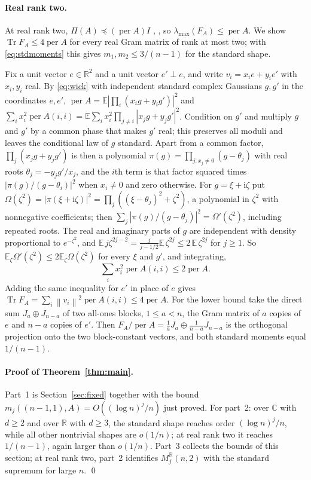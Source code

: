\documentclass[11pt,a4paper]{article}
\theoremstyle{remark}
\newcommand{\per}{\operatorname{per}}
\newcommand{\Tr}{\operatorname{Tr}}
\newcommand{\norm}[1]{\left\lVert#1\right\rVert}
\newcommand{\R}{\mathbb R}
\newcommand{\C}{\mathbb C}
\newcommand{\E}{\mathbb E}
\begin{document}
\paragraph{Real rank two.} At real rank two, $\Pi(A)\preceq(\per A)I$ \cite{Liq}, \cite[Appendix~A]{EPBS}, so $\lambda_{\max}(F_A)\le\per A$. We show $\Tr F_A\le4\per A$ for every real Gram matrix of rank at most two; with \eqref{eq:stdmoments} this gives $m_1,m_2\le3/(n-1)$ for the standard shape.

Fix a unit vector $e\in\R^2$ and a unit vector $e'\perp e$, and write $v_i=x_ie+y_ie'$ with $x_i,y_i$ real. By \eqref{eq:wick} with independent standard complex Gaussians $g,g'$ in the coordinates $e,e'$, $\per A=\E|\prod_i(x_ig+y_ig')|^2$ and $\sum_ix_i^2\per A(i,i)=\E\sum_ix_i^2\prod_{j\ne i}|x_jg+y_jg'|^2$. Condition on $g'$ and multiply $g$ and $g'$ by a common phase that makes $g'$ real; this preserves all moduli and leaves the conditional law of $g$ standard. Apart from a common factor, $\prod_j(x_jg+y_jg')$ is then a polynomial $\pi(g)=\prod_{j:x_j\ne0}(g-\theta_j)$ with real roots $\theta_j=-y_jg'/x_j$, and the $i$th term is that factor squared times $|\pi(g)/(g-\theta_i)|^2$ when $x_i\ne0$ and zero otherwise. For $g=\xi+\mathrm i\zeta$ put $\Omega(\zeta^2)=|\pi(\xi+\mathrm i\zeta)|^2=\prod_j((\xi-\theta_j)^2+\zeta^2)$, a polynomial in $\zeta^2$ with nonnegative coefficients; then $\sum_j|\pi(g)/(g-\theta_j)|^2=\Omega'(\zeta^2)$, including repeated roots. The real and imaginary parts of $g$ are independent with density proportional to $e^{-\zeta^2}$, and $\E\,j\zeta^{2j-2}=\frac{j}{j-1/2}\E\,\zeta^{2j}\le2\,\E\,\zeta^{2j}$ for $j\ge1$. So $\E_\zeta\Omega'(\zeta^2)\le2\E_\zeta\Omega(\zeta^2)$ for every $\xi$ and $g'$, and integrating,
\[
 \sum_ix_i^2\per A(i,i)\le2\per A .
\]
Adding the same inequality for $e'$ in place of $e$ gives $\Tr F_A=\sum_i\norm{v_i}^2\per A(i,i)\le4\per A$. For the lower bound take the direct sum $J_a\oplus J_{n-a}$ of two all-ones blocks, $1\le a<n$, the Gram matrix of $a$ copies of $e$ and $n-a$ copies of $e'$. Then $F_A/\per A=\frac1aJ_a\oplus\frac1{n-a}J_{n-a}$ is the orthogonal projection onto the two block-constant vectors, and both standard moments equal $1/(n-1)$.

\paragraph{Proof of Theorem~\ref{thm:main}.} Part~1 is Section~\ref{sec:fixed} together with the bound $m_j((n-1,1),A)=O((\log n)^j/n)$ just proved. For part~2: over $\C$ with $d\ge2$ and over $\R$ with $d\ge3$, the standard shape reaches order $(\log n)^j/n$, while all other nontrivial shapes are $o(1/n)$; at real rank two it reaches $1/(n-1)$, again larger than $o(1/n)$. Part~3 collects the bounds of this section; at real rank two, part~2 identifies $M_j^\R(n,2)$ with the standard supremum for large $n$. \qed
\end{document}
